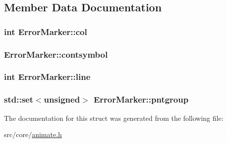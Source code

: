 \subsection{Member Data Documentation}
\hypertarget{a00098_a1c5609a6e942b4d2879d69b3a805d17c}{
\subsubsection[{col}]{\setlength{\rightskip}{0pt plus 5cm}int Error\-Marker\-::col}}\label{a00098_a1c5609a6e942b4d2879d69b3a805d17c}
\hypertarget{a00098_a821db80e4017d90176001807bf462ceb}{
\subsubsection[{contsymbol}]{ Error\-Marker\-::contsymbol}}\label{a00098_a821db80e4017d90176001807bf462ceb}
\hypertarget{a00098_a57974506211511be0e378d9a5dea0339}{
\subsubsection[{line}]{\setlength{\rightskip}{0pt plus 5cm}int Error\-Marker\-::line}}\label{a00098_a57974506211511be0e378d9a5dea0339}
\hypertarget{a00098_a7008a13736fc236965b4cc927141196b}{
\subsubsection[{pntgroup}]{\setlength{\rightskip}{0pt plus 5cm}std\-::set$<$unsigned$>$ Error\-Marker\-::pntgroup}}\label{a00098_a7008a13736fc236965b4cc927141196b}


The documentation for this struct was generated from the following file\-:\begin{DoxyCompactItemize}
\item 
src/core/\hyperlink{a00195}{animate.\-h}\end{DoxyCompactItemize}
